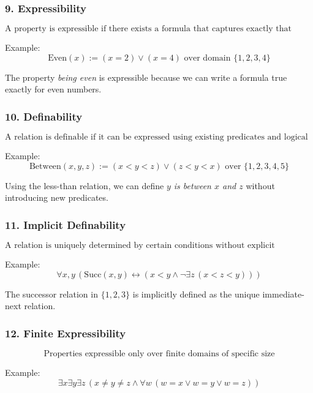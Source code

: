 \subsubsection{9. Expressibility}\label{expressibility}

\[\text{A property is expressible if there exists a formula that captures exactly that property}\]

Example:
\[\text{Even}(x) := (x = 2) \vee (x = 4) \text{ over domain } \{1,2,3,4\}\]

The property \emph{being even} is expressible because we can write a
formula true exactly for even numbers.

\subsubsection{10. Definability}\label{definability}

\[\text{A relation is definable if it can be expressed using existing predicates and logical operators}\]

Example:
\[\text{Between}(x,y,z) := (x < y < z) \vee (z < y < x) \text{ over } \{1,2,3,4,5\}\]

Using the less-than relation, we can define \emph{\(y\) is between \(x\)
and \(z\)} without introducing new predicates.

\subsubsection{11. Implicit Definability}\label{implicit-definability}

\[\text{A relation is uniquely determined by certain conditions without explicit construction}\]

Example:
\[\forall x,y \, (\text{Succ}(x,y) \leftrightarrow (x < y \wedge \neg\exists z \, (x < z < y)))\]

The successor relation in \(\{1,2,3\}\) is implicitly defined as the
unique immediate-next relation.

\subsubsection{12. Finite Expressibility}\label{finite-expressibility}

\[\text{Properties expressible only over finite domains of specific size}\]

Example:
\[\exists x \exists y \exists z \, (x \neq y \neq z \wedge \forall w \, (w = x \vee w = y \vee w = z))\]

